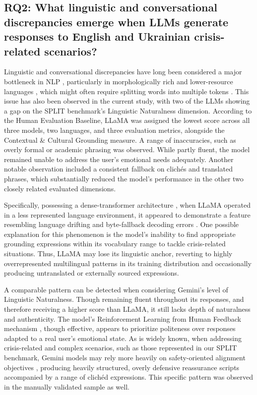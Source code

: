 \documentclass[10pt, twocolumn]{article}
\begin{document}
\subsection{RQ2:  What linguistic and conversational discrepancies emerge when LLMs generate responses to English and Ukrainian crisis-related scenarios?}
Linguistic and conversational discrepancies have long been considered a major bottleneck in NLP \cite{xing2024evaluating, han2025mubenchassessmentmultilingualcapabilities}, particularly in morphologically rich and lower-resource languages \cite{xing2024evaluating, lim2025understanding}, which might often require splitting words into multiple tokens \cite{churchill2026reducingtokenizationpremiumslowresource}. This issue has also been observed in the current study, with two of the LLMs showing a gap on the SPLIT benchmark's Linguistic Naturalness dimension.
According to the Human Evaluation Baseline, LLaMA was assigned the lowest score across all three models, two languages, and three evaluation metrics, alongside the Contextual \& Cultural Grounding measure. A range of inaccuracies, such as overly formal or academic phrasing was observed. While partly fluent, the model remained unable to address the user's emotional needs adequately. Another notable observation included a consistent fallback on clichés and translated phrases, which substantially reduced the model's performance in the other two closely related evaluated dimensions.

Specifically, possessing a dense-transformer architecture \cite{grattafiori2024llama3herdmodels}, when LLaMA operated in a less represented language environment, it appeared to demonstrate a feature resembling language drifting and byte-fallback decoding errors \cite{jang2024improbable}. One possible explanation for this phenomenon is the model's inability to find appropriate grounding expressions within its vocabulary range to tackle crisis-related situations. Thus, LLaMA may lose its linguistic anchor, reverting to highly overrepresented multilingual patterns in its training distribution and occasionally producing untranslated or externally sourced expressions.

A comparable pattern can be detected when considering Gemini's level of Linguistic Naturalness. Though remaining fluent throughout its responses, and therefore receiving a higher score than LLaMA, it still lacks depth of naturalness and authenticity. The model's Reinforcement Learning from Human Feedback mechanism \cite{comanici2025gemini25pushingfrontier}, though effective, appears to prioritize politeness over responses adapted to a real user's emotional state. As is widely known, when addressing crisis-related and complex scenarios, such as those represented in our SPLIT benchmark, Gemini models may rely more heavily on safety-oriented alignment objectives \cite{comanici2025gemini25pushingfrontier}, producing heavily structured, overly defensive reassurance scripts accompanied by a range of clichéd expressions. This specific pattern was observed in the manually validated sample as well.
\end{document}
